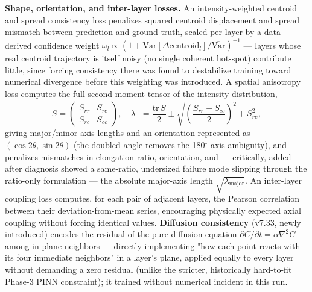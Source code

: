 \documentclass[11pt]{article}
\begin{document}
\textbf{Shape, orientation, and inter-layer losses.} An intensity-weighted centroid and spread consistency loss penalizes squared centroid displacement and spread mismatch between prediction and ground truth, scaled per layer by a data-derived confidence weight $\omega_l\propto(1+\mathrm{Var}[\Delta\mathrm{centroid}_l]/\overline{\mathrm{Var}})^{-1}$ — layers whose real centroid trajectory is itself noisy (no single coherent hot-spot) contribute little, since forcing consistency there was found to destabilize training toward numerical divergence before this weighting was introduced. A spatial anisotropy loss computes the full second-moment tensor of the intensity distribution,
\begin{equation}
S = \begin{pmatrix}S_{rr}&S_{rc}\\S_{rc}&S_{cc}\end{pmatrix},\quad
\lambda_{\pm}=\frac{\mathrm{tr}\,S}{2}\pm\sqrt{\left(\frac{S_{rr}-S_{cc}}{2}\right)^2+S_{rc}^2},
\label{eq:anisotropy}
\end{equation}
giving major/minor axis lengths and an orientation represented as $(\cos2\theta,\sin2\theta)$ (the doubled angle removes the 180$^\circ$ axis ambiguity), and penalizes mismatches in elongation ratio, orientation, and — critically, added after diagnosis showed a same-ratio, undersized failure mode slipping through the ratio-only formulation — the absolute major-axis length $\sqrt{\lambda_{\mathrm{major}}}$. An inter-layer coupling loss computes, for each pair of adjacent layers, the Pearson correlation between their deviation-from-mean series, encouraging physically expected axial coupling without forcing identical values. \textbf{Diffusion consistency} (v7.33, newly introduced) encodes the residual of the pure diffusion equation $\partial C/\partial t = \alpha\nabla^2C$ among in-plane neighbors — directly implementing "how each point reacts with its four immediate neighbors" in a layer's plane, applied equally to every layer without demanding a zero residual (unlike the stricter, historically hard-to-fit Phase-3 PINN constraint); it trained without numerical incident in this run.
\end{document}
